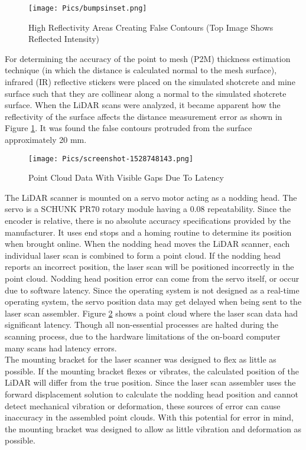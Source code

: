 \begin{figure}
    \centering
    \texttt{[image: Pics/bumpsinset.png]}
    \caption{High Reflectivity Areas Creating False Contours (Top Image Shows Reflected Intensity)}
    \label{fig:bumps}
\end{figure}

For determining the accuracy of the point to mesh (P2M) thickness estimation technique (in which the distance is calculated normal to the mesh surface), infrared (IR) reflective stickers were placed on the simulated shotcrete and mine surface such that they are collinear along a normal to the simulated shotcrete surface. When the LiDAR scans were analyzed, it became apparent how the reflectivity of the surface affects the distance measurement error as shown in Figure \ref{fig:bumps}. It was found the false contours protruded from the surface approximately 20 mm.\\

\begin{figure}
    \centering
    \texttt{[image: Pics/screenshot-1528748143.png]}
    \caption{Point Cloud Data With Visible Gaps Due To Latency}
    \label{fig:headlag}
\end{figure}
The LiDAR scanner is mounted on a servo motor acting as a nodding head. The servo is a SCHUNK PR70 rotary module having a 0.08\degree\hspace{0pt} repeatability. Since the encoder is relative, there is no absolute accuracy specifications provided by the manufacturer. It uses end stops and a homing routine to determine its position when brought online. When the nodding head moves the LiDAR scanner, each individual laser scan is combined to form a point cloud. If the nodding head reports an incorrect position, the laser scan will be positioned incorrectly in the point cloud. Nodding head position error can come from the servo itself, or occur due to software latency. Since the operating system is not designed as a real-time operating system, the servo position data may get delayed when being sent to the laser scan assembler. Figure \ref{fig:headlag} shows a point cloud where the laser scan data had significant latency. Though all non-essential processes are halted during the scanning process, due to the hardware limitations of the on-board computer many scans had latency errors.\\

The mounting bracket for the laser scanner was designed to flex as little as possible. If the mounting bracket flexes or vibrates, the calculated position of the LiDAR will differ from the true position. Since the laser scan assembler uses the forward displacement solution to calculate the nodding head position and cannot detect mechanical vibration or deformation, these sources of error can cause inaccuracy in the assembled point clouds. With this potential for error in mind, the mounting bracket was designed to allow as little vibration and deformation as possible.\\

